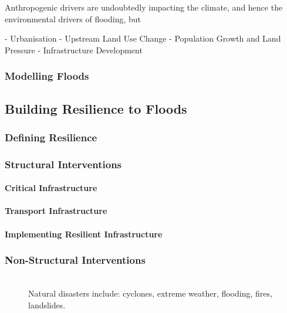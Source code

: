 Anthropogenic drivers are undoubtedly impacting the climate, and hence the
environmental drivers of flooding, but 

- Urbanisation
- Upstream Land Use Change
- Population Growth and Land Pressure
- Infrastructure Development

\subsubsection{Modelling Floods}

\subsection{Building Resilience to Floods}

\subsubsection{Defining Resilience}

\subsubsection{Structural Interventions}

\paragraph{Critical Infrastructure}

\paragraph{Transport Infrastructure}

\paragraph{Implementing Resilient Infrastructure}

\subsubsection{Non-Structural Interventions}

\begin{figure}
    \centering
    \includegraphics[width=1.0]{Content/Figures/02_Literature_Review/damage_costs_NZ_natural_disasters.pdf}
    \caption{Natural disasters include: cyclones, extreme weather, flooding, fires, landslides.}
\end{figure}
